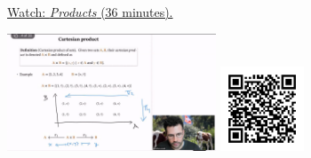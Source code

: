
\begin{minipage}{10cm}
    \href{https://act4e-spring21.netlify.app/videos/spring2021-products:products.html}{Watch: \emph{Products} (36 minutes).}
        
    \href{https://act4e-spring21.netlify.app/videos/spring2021-products:products.html}{\includegraphics[height=3.5cm]{spring2021-products:products/thumbnails.jpg}}
    \href{https://act4e-spring21.netlify.app/videos/spring2021-products:products.html}{\includegraphics[height=2.5cm]{spring2021-products:products/qrcode.png}}
\end{minipage}
